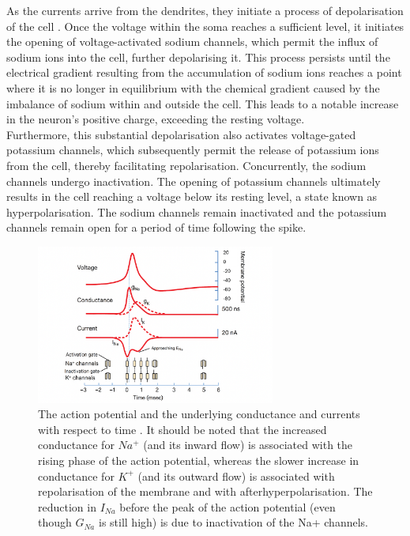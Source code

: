 \noindent As the currents arrive from the dendrites, they initiate a process of depolarisation of the cell \cite{johnston1996active}. Once the voltage within the soma reaches a sufficient level, it initiates the opening of voltage-activated sodium channels, which permit the influx of sodium ions into the cell, further depolarising it. This process persists until the electrical gradient resulting from the accumulation of sodium ions reaches a point where it is no longer in equilibrium with the chemical gradient caused by the imbalance of sodium within and outside the cell. This leads to a notable increase in the neuron's positive charge, exceeding the resting voltage. \\

\noindent Furthermore, this substantial depolarisation also activates voltage-gated potassium channels, which subsequently permit the release of potassium ions from the cell, thereby facilitating repolarisation. Concurrently, the sodium channels undergo inactivation. The opening of potassium channels ultimately results in the cell reaching a voltage below its resting level, a state known as hyperpolarisation. The sodium channels remain inactivated and the potassium channels remain open for a period of time following the spike. \\

\begin{figure}[htbp!] 
    \centering    
    \includegraphics[width=0.7\textwidth]{Chapter2/Figs/b.png}
    \caption[Spiking dynamics of a neuron.]{The action potential and the underlying conductance and currents with respect to time \cite{squire2012fundamental}. It should be noted that the increased conductance for $Na^+$ (and its inward flow) is associated with the rising phase of the action potential, whereas the slower increase in conductance for $K^+$ (and its outward flow) is associated with repolarisation of the membrane and with afterhyperpolarisation. The reduction in $I_{Na}$ before the peak of the action potential (even though $G_{Na}$ is still high) is due to inactivation of the Na+ channels.}
    \label{fig:2b}
\end{figure}

